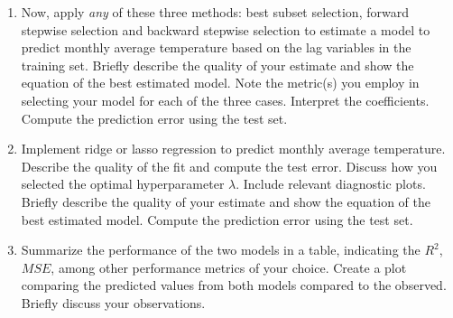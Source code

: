 \documentclass[11pt,twoside]{article}
\newcommand{\pts}[1]{\marginpar{ \small\hspace{0pt} \textit{[#1]} } }
\newcommand{\?}{\stackrel{?}{=}}
\newcommand{\la}{\lambda}
\begin{document}
\begin{enumerate}[\bf (a)]
\item Now, apply \textit{any} of these three methods: \pts{5}
  best subset selection, forward stepwise selection and backward stepwise
  selection to estimate a model to predict monthly average temperature based on the lag variables in the training set.
  Briefly describe the quality of your estimate and show the equation of the best estimated model.
  Note the metric(s) you employ in selecting your model for each of the three cases.
  Interpret the coefficients. Compute the prediction error using the test set.

\item Implement ridge or lasso regression to predict monthly average temperature. Describe the quality of the fit and compute the test error. \pts{5}
  Discuss how you selected the optimal hyperparameter $\la$. Include relevant diagnostic plots.
  Briefly describe the quality of your estimate and show the equation of the best estimated model.
  Compute the prediction error using the test set.
  
  
\item Summarize the performance of the two models in a table, \pts{4}
  indicating the $R^{2}$, $MSE$, among other performance metrics of your choice.
  Create a plot comparing the predicted values from both models compared to the observed.
  Briefly discuss your observations.
\end{enumerate}

\bigskip

\end{document}
